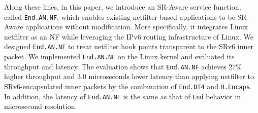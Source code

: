Along these lines, in this paper, we introduce an SR-Aware service function, called \texttt{End.AN.NF}, which enables existing netfilter-based applications to be SR-Aware applications without modification.
More specifically, it integrates Linux netfilter as an NF while leveraging the IPv6 routing infrastructure of Linux.
We designed \texttt{End.AN.NF} to treat netfilter hook points transparent to the SRv6 inner packet.
We implemented \texttt{End.AN.NF} on the Linux kernel and evaluated its throughput and latency.
The evaluation shows that \texttt{End.AN.NF} achieves 27\% higher throughput and 3.0 microseconds lower latency than applying netfilter to SRv6-encapsulated inner packets by the combination of \texttt{End.DT4} and \texttt{H.Encaps}.
In addition, the latency of \texttt{End.AN.NF} is the same as that of \texttt{End} behavior in microsecond resolution.